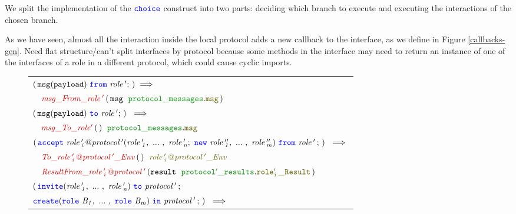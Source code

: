 \documentclass[12pt,twoside]{report}
\begin{document}
We split the implementation of the ${\color{blue}\mathtt{choice}}$ construct into two parts: deciding which branch to execute and executing the interactions of the chosen branch.





As we have seen, almost all the interaction inside the local protocol adds a new callback to the interface, as we define in Figure \ref{callbacks-gen}.
Need flat structure/can't split interfaces by protocol because some methods in the interface may need to return an instance of one of the interfaces of a role in a different protocol, which could cause cyclic imports.

\begin{figure}[!h]
    \begin{center}
        \begin{tabular}{l}
            $(\,\scrmessage{msg}{payload}\ \from\ \mathit{role\,'};\,) \implies$\\[6pt]
            
            $\quad \functionname{msg\_From\_role\,'}\,(\,\varname{msg}\ \;\pkgstructaccess{protocol\_messages}{msg}\,)\;\ $\\[15pt]
            
            $(\,\scrmessage{msg}{payload}\ \scrto\ \mathit{role\,'};\,)\ \implies$\\[6pt] 
            
            $\quad \functionname{msg\_To\_role'}\,(\,)\;\ \pkgstructaccess{protocol\_messages}{msg}$\\[15pt]
            
            $(\,\acceptL{role\,'_i\,@protocol\,'}{role\,'}{role\,''}{role\,'}\,;\,)\ \implies$\\[6pt]
            
            $\quad \functionname{To\_\localprotocol{role\,'_i\,}{protocol\,'}\_Env}\,(\,)\;\ \interfacename{\localprotocol{role\,'_i\,}{protocol\,'}\_Env}$\\[3pt]

            $\quad \functionname{ResultFrom\_\localprotocol{role\,'_i\,}{protocol\,'}}\,(\varname{result}\ \;\pkgstructaccess{protocol'\_results}{role'_i\,\_Result}\,)\;$\\[15pt]

            $(\,\invite(\roles{role\,'}{n})\ \scrto\ \mathit{protocol\,'}\,;$\\[1.5pt] 
            $\create(\rolessig{B}{m})\ \scrin\ \mathit{protocol\,'}\,;\,)\ \implies$\\[6pt]
            

\end{tabular}
\end{center}
\end{figure}
\end{document}
